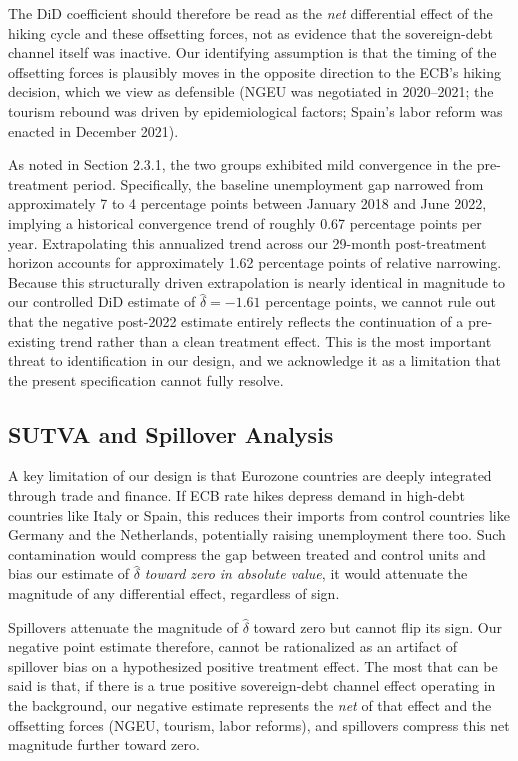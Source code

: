\documentclass[11pt,a4paper]{article}
\begin{document}
The DiD coefficient should therefore be read as the \emph{net} differential effect of the hiking cycle and these offsetting forces, not as evidence that the sovereign-debt channel itself was inactive. Our identifying assumption is that the timing of the offsetting forces is plausibly moves in the opposite direction to the ECB's hiking decision, which we view as defensible (NGEU was negotiated in 2020--2021; the tourism rebound was driven by epidemiological factors; Spain's labor reform was enacted in December 2021).


As noted in Section 2.3.1, the two groups exhibited mild convergence in the pre-treatment period. Specifically, the baseline unemployment gap narrowed from approximately 7 to 4 percentage points between January 2018 and June 2022, implying a historical convergence trend of roughly 0.67 percentage points per year. Extrapolating this annualized trend across our 29-month post-treatment horizon accounts for approximately 1.62 percentage points of relative narrowing. Because this structurally driven extrapolation is nearly identical in magnitude to our controlled DiD estimate of $\hat{\delta} = -1.61$ percentage points, we cannot rule out that the negative post-2022 estimate entirely reflects the continuation of a pre-existing trend rather than a clean treatment effect. This is the most important threat to identification in our design, and we acknowledge it as a limitation that the present specification cannot fully resolve.

\subsection{SUTVA and Spillover Analysis}
\label{sec:sutva}

A key limitation of our design is that Eurozone countries are deeply integrated through trade and finance. If ECB rate hikes depress demand in high-debt countries like Italy or Spain, this reduces their imports from control countries like Germany and the Netherlands, potentially raising unemployment there too. Such contamination would compress the gap between treated and control units and bias our estimate of $\hat{\delta}$ \emph{toward zero in absolute value}, it would attenuate the magnitude of any differential effect, regardless of sign.

Spillovers attenuate the magnitude of $\hat{\delta}$ toward zero but cannot flip its sign. Our negative point estimate therefore, cannot be rationalized as an artifact of spillover bias on a hypothesized positive treatment effect.  The most that can be said is that, if there is a true positive sovereign-debt channel effect operating in the background, our negative estimate represents the \emph{net} of that effect and the offsetting forces (NGEU, tourism, labor reforms), and spillovers compress this net magnitude further toward zero.
\end{document}
